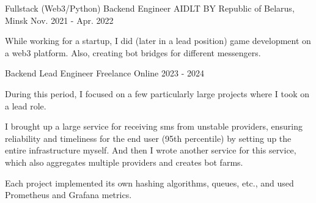 \begin{cventries}

\cventry
{Fullstack (Web3/Python) Backend Engineer} %
{AIDLT BY} %
{Republic of Belarus, Minsk} %
{Nov. 2021 - Apr. 2022} %
{ %
\begin{cvitems}
\item { While working for a startup, I did (later in a lead position) game development on a web3 platform. 
Also, creating bot bridges for different messengers. }
\end{cvitems}
}


\cventry
{Backend Lead Engineer} %
{Freelance} %
{Online} %
{2023 - 2024} %
{ %
\begin{cvitems}
\item{ During this period, I focused on a few particularly large projects where I took on a lead role.} 
\item { I brought up a large service for receiving sms from unstable providers, ensuring reliability and timeliness for the end user (95th percentile) by setting up the entire infrastructure myself. And then I wrote another service for this service, which also aggregates multiple providers and creates bot farms. }
\item {Each project implemented its own hashing algorithms, queues, etc., and used Prometheus and Grafana metrics.  }
\end{cvitems} 
}



\end{cventries}